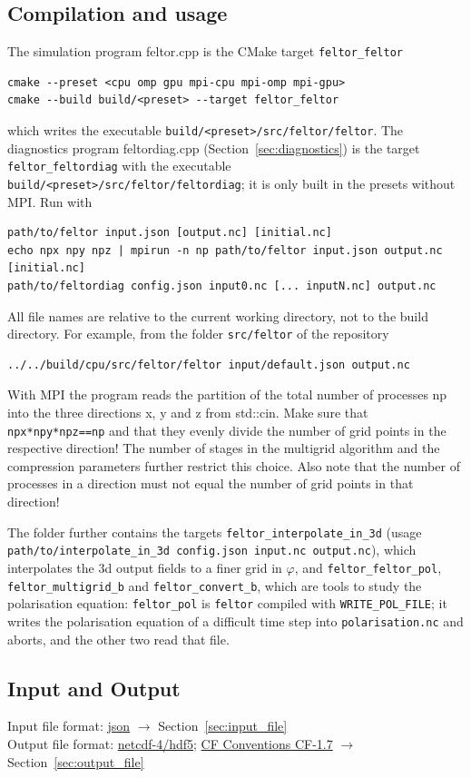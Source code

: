 \subsection{Compilation and usage}
The simulation program feltor.cpp is the CMake target \texttt{feltor\_feltor}
\begin{verbatim}
cmake --preset <cpu omp gpu mpi-cpu mpi-omp mpi-gpu>
cmake --build build/<preset> --target feltor_feltor
\end{verbatim}
which writes the executable \texttt{build/<preset>/src/feltor/feltor}.
The diagnostics program feltordiag.cpp (Section~\ref{sec:diagnostics}) is the
target \texttt{feltor\_feltordiag} with the executable
\texttt{build/<preset>/src/feltor/feltordiag}; it is only built in the presets
without MPI.
Run with
\begin{verbatim}
path/to/feltor input.json [output.nc] [initial.nc]
echo npx npy npz | mpirun -n np path/to/feltor input.json output.nc [initial.nc]
path/to/feltordiag config.json input0.nc [... inputN.nc] output.nc
\end{verbatim}
All file names are relative to the current working directory, not to the
build directory. For example, from the folder \texttt{src/feltor} of the
repository
\begin{verbatim}
../../build/cpu/src/feltor/feltor input/default.json output.nc
\end{verbatim}
With MPI the program reads the
partition of the total number of processes np into the three directions x, y and z
from std::cin.
Make sure that \texttt{npx*npy*npz==np} and that
they evenly divide the number of grid points in the respective direction! The
number of stages in the multigrid algorithm and the compression parameters further
restrict this choice. Also note that the number of processes in a direction must
not equal the number of grid points in that direction!

The folder further contains the targets
\texttt{feltor\_interpolate\_in\_3d} (usage \texttt{path/to/interpolate_in_3d config.json input.nc output.nc}), which interpolates the 3d output fields to a finer grid in
$\varphi$, and \texttt{feltor\_feltor\_pol}, \texttt{feltor\_multigrid\_b} and
\texttt{feltor\_convert\_b}, which are tools to study the polarisation
equation: \texttt{feltor\_pol} is \texttt{feltor} compiled with
\texttt{WRITE\_POL\_FILE}; it writes the polarisation equation of a difficult
time step into \texttt{polarisation.nc} and aborts, and the other two read that file.
\subsection{Input and Output}
Input file format: \href{https://en.wikipedia.org/wiki/JSON}{json} $\rightarrow$ Section~\ref{sec:input_file} \\
Output file format: \href{https://www.unidata.ucar.edu/software/netcdf/docs/}{netcdf-4/hdf5};
\href{http://cfconventions.org/Data/cf-conventions/cf-conventions-1.7/cf-conventions.html}{CF Conventions CF-1.7}
 $\rightarrow$ Section~\ref{sec:output_file} \\

